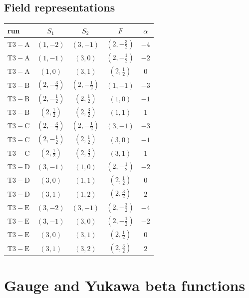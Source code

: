 \documentclass[9pt]{article}
\begin{document}
\subsection*{Field representations}
\begin{longtable}{@{}lcccc@{}}
\toprule
run & $S_1$ & $S_2$ & $F$ & $\alpha$ \\
\midrule
$\mathrm{T3-A}$ & $(1,-2)$ & $(3,-1)$ & $(2,- \frac{3}{2})$ & $-4$ \\
$\mathrm{T3-A}$ & $(1,-1)$ & $(3,0)$ & $(2,- \frac{1}{2})$ & $-2$ \\
$\mathrm{T3-A}$ & $(1,0)$ & $(3,1)$ & $(2,\frac{1}{2})$ & $0$ \\
$\mathrm{T3-B}$ & $(2,- \frac{3}{2})$ & $(2,- \frac{1}{2})$ & $(1,-1)$ & $-3$ \\
$\mathrm{T3-B}$ & $(2,- \frac{1}{2})$ & $(2,\frac{1}{2})$ & $(1,0)$ & $-1$ \\
$\mathrm{T3-B}$ & $(2,\frac{1}{2})$ & $(2,\frac{3}{2})$ & $(1,1)$ & $1$ \\
$\mathrm{T3-C}$ & $(2,- \frac{3}{2})$ & $(2,- \frac{1}{2})$ & $(3,-1)$ & $-3$ \\
$\mathrm{T3-C}$ & $(2,- \frac{1}{2})$ & $(2,\frac{1}{2})$ & $(3,0)$ & $-1$ \\
$\mathrm{T3-C}$ & $(2,\frac{1}{2})$ & $(2,\frac{3}{2})$ & $(3,1)$ & $1$ \\
$\mathrm{T3-D}$ & $(3,-1)$ & $(1,0)$ & $(2,- \frac{1}{2})$ & $-2$ \\
$\mathrm{T3-D}$ & $(3,0)$ & $(1,1)$ & $(2,\frac{1}{2})$ & $0$ \\
$\mathrm{T3-D}$ & $(3,1)$ & $(1,2)$ & $(2,\frac{3}{2})$ & $2$ \\
$\mathrm{T3-E}$ & $(3,-2)$ & $(3,-1)$ & $(2,- \frac{3}{2})$ & $-4$ \\
$\mathrm{T3-E}$ & $(3,-1)$ & $(3,0)$ & $(2,- \frac{1}{2})$ & $-2$ \\
$\mathrm{T3-E}$ & $(3,0)$ & $(3,1)$ & $(2,\frac{1}{2})$ & $0$ \\
$\mathrm{T3-E}$ & $(3,1)$ & $(3,2)$ & $(2,\frac{3}{2})$ & $2$ \\
\bottomrule
\end{longtable}
\section*{Gauge and Yukawa beta functions}
\end{document}
